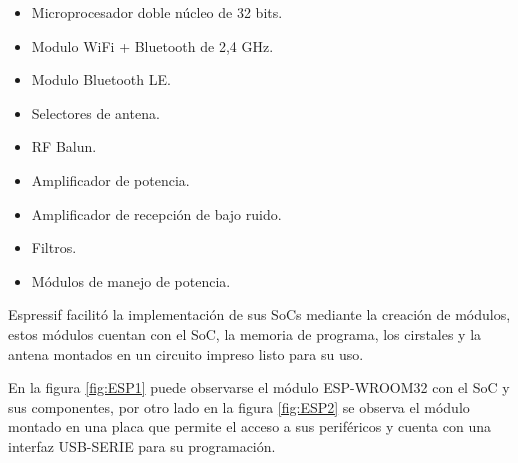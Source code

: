 \begin{itemize}
	\item Microprocesador doble núcleo de 32 bits.
	\item Modulo WiFi + Bluetooth de 2,4 GHz.
	\item Modulo Bluetooth LE.
	\item Selectores de antena.
	\item RF Balun.
	\item Amplificador de potencia.
	\item Amplificador de recepción de bajo ruido.
	\item Filtros.
	\item Módulos de manejo de potencia.
\end{itemize}


Espressif facilitó la implementación de sus SoCs mediante la creación de módulos, estos módulos cuentan con el SoC, la memoria de programa, los cirstales y la antena montados en un circuito impreso listo para su uso. 

En la figura \ref{fig:ESP1} puede observarse el módulo ESP-WROOM32 con el SoC y sus componentes, por otro lado en la figura \ref{fig:ESP2} se observa el módulo montado en una placa que permite el acceso a sus periféricos y cuenta con una interfaz USB-SERIE para su programación.

%

